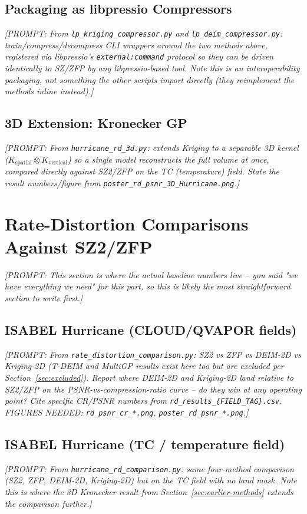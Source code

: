 \documentclass[11pt]{article}
\newcommand{\prompt}[1]{{\color{red}\itshape [PROMPT: #1]}\par\medskip}
\begin{document}
\subsection{Packaging as libpressio Compressors}
\prompt{From \texttt{lp\_kriging\_compressor.py} and
\texttt{lp\_deim\_compressor.py}: train/compress/decompress CLI wrappers
around the two methods above, registered via libpressio's
\texttt{external:command} protocol so they can be driven identically to
SZ/ZFP by any libpressio-based tool. Note this is an interoperability
packaging, not something the other scripts import directly (they
reimplement the methods inline instead).}

\subsection{3D Extension: Kronecker GP}
\prompt{From \texttt{hurricane\_rd\_3d.py}: extends Kriging to a
separable 3D kernel ($K_{\text{spatial}} \otimes K_{\text{vertical}}$)
so a single model reconstructs the full volume at once, compared
directly against SZ2/ZFP on the TC (temperature) field. State the
result numbers/figure from \texttt{poster\_rd\_psnr\_3D\_Hurricane.png}.}

\section{Rate-Distortion Comparisons Against SZ2/ZFP}
\label{sec:rd-comparisons}

\prompt{This section is where the actual baseline numbers live --
you said "we have everything we need" for this part, so this is
likely the most straightforward section to write first.}

\subsection{ISABEL Hurricane (CLOUD/QVAPOR fields)}
\prompt{From \texttt{rate\_distortion\_comparison.py}: SZ2 vs ZFP vs
DEIM-2D vs Kriging-2D (T-DEIM and MultiGP results exist here too but
are excluded per Section~\ref{sec:excluded}). Report where DEIM-2D and
Kriging-2D land relative to SZ2/ZFP on the PSNR-vs-compression-ratio
curve -- do they win at any operating point? Cite specific CR/PSNR
numbers from \texttt{rd\_results\_\{FIELD\_TAG\}.csv}.
FIGURES NEEDED: \texttt{rd\_psnr\_cr\_*.png}, \texttt{poster\_rd\_psnr\_*.png}.}

\subsection{ISABEL Hurricane (TC / temperature field)}
\prompt{From \texttt{hurricane\_rd\_comparison.py}: same four-method
comparison (SZ2, ZFP, DEIM-2D, Kriging-2D) but on the TC field with no
land mask. Note this is where the 3D Kronecker result from
Section~\ref{sec:earlier-methods} extends the comparison further.}
\end{document}
